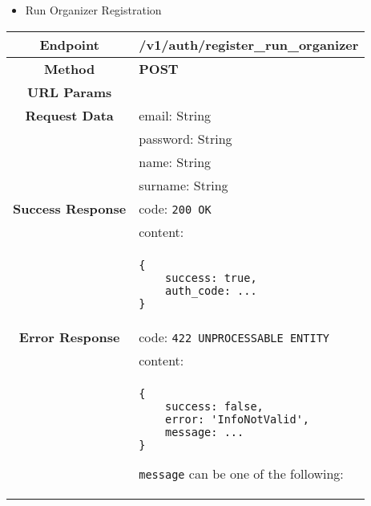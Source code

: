 \begin{itemize}
        \item Run Organizer Registration
    \end{itemize}
    \begin{adjustwidth}{1cm}{}
        \begin{longtable}{|c|l|}
            \hline
            \textbf{Endpoint} & /v1/auth/register\_run\_organizer \\
            \hline
            \textbf{Method} & \textbf{POST} \\
            \hline
            \textbf{URL Params} &  \\
            \hline
            \textbf{Request Data} & email: String \\
            &                 password: String \\
            &                 name: String \\
            &                 surname: String \\
            \hline
            \textbf{Success Response} & code: \texttt{200 OK} \\
            &                           content: \\
            & \begin{minipage}[t]{0.5\textwidth}
                \begin{adjustwidth}{1.5cm}{}
                \begin{verbatim}
{
    success: true, 
    auth_code: ...
}
                \end{verbatim}
                \end{adjustwidth}
              \end{minipage} \\
              \hline
            \textbf{Error Response} & code: \texttt{422 UNPROCESSABLE ENTITY} \\
            &                         content: \\
            & \begin{minipage}[t]{0.7\textwidth}
                \begin{adjustwidth}{1.5cm}{}
                \begin{verbatim}
{
    success: false, 
    error: 'InfoNotValid',
    message: ...
}
                \end{verbatim}
                \end{adjustwidth}
                \texttt{message} can be one of the following: 
                \begin{itemize}

\end{itemize}
\end{minipage}
\end{longtable}
\end{adjustwidth}
